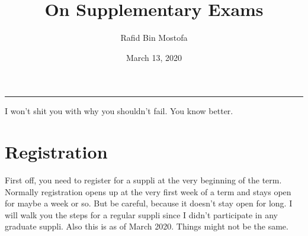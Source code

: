 \documentclass[]{article}
\title{On Supplementary Exams}
\author{Rafid Bin Mostofa}
\date{March 13, 2020}
\begin{document}
	\maketitle
	\hrule \vspace{0.5cm}

	\noindent I won't shit you with why you shouldn't fail. You know better.
	
	\section{Registration}
	First off, you need to register for a suppli at the very beginning of the term. Normally registration opens up at the very first week of a term and stays open for maybe a week or so. But be careful, because it doesn't stay open for long. I will walk you the steps for a regular suppli since I didn't participate in any graduate suppli. Also this is as of March 2020. Things might not be the same. \vspace{0.5cm}
\end{document}
